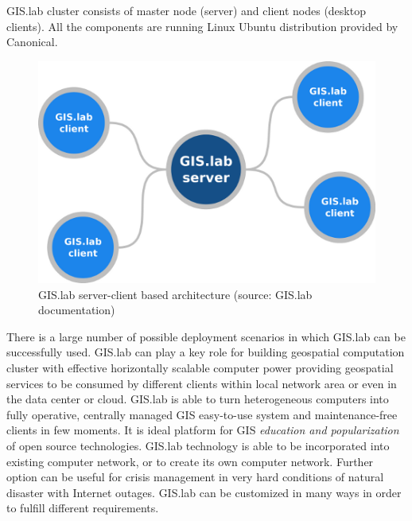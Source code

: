 \documentclass{isprs}
\begin{document}
GIS.lab cluster consists of master node (server) and client nodes
(desktop clients). All the components are running Linux Ubuntu
distribution provided by Canonical.

\begin{figure}[ht!]
\begin{center}
  \includegraphics[width=.7\columnwidth]{figures/gislab-server-client-architecture.png}
  \caption{GIS.lab server-client based architecture (source: GIS.lab
    documentation)}
\label{fig:gislab_infrastructure}
\end{center}
\end{figure}

There is a large number of possible deployment scenarios in which
GIS.lab can be successfully used. GIS.lab can play a key role for
building geospatial computation cluster with effective horizontally
scalable computer power providing geospatial services to be consumed
by different clients within local network area or even in the data
center or cloud. GIS.lab is able to turn heterogeneous computers into
fully operative, centrally managed GIS easy-to-use system and
maintenance-free clients in few moments. It is ideal platform for GIS
\textit{education and popularization} of open source
technologies. GIS.lab technology is able to be incorporated into
existing computer network, or to create its own computer
network. Further option can be useful for crisis management in very
hard conditions of natural disaster with Internet outages. GIS.lab can
be customized in many ways in order to fulfill different requirements.
\end{document}
